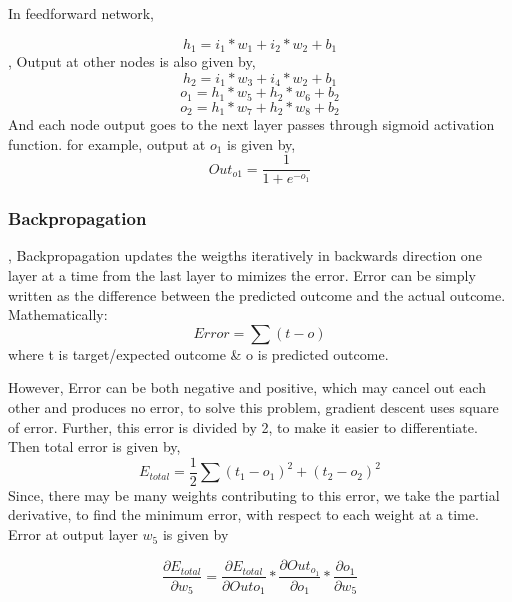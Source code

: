 \documentclass[a4paper,12pt]{report}
\begin{document}
In feedforward network,

\begin{equation}
h_1 = i_1 * w_1 + i_2 * w_2+ b_1
\end{equation},
Output at other nodes is also given by,
\begin{equation}
h_2 = i_1 * w_3 + i_4 * w_2+ b_1
\end{equation}
\begin{equation}
o_1 = h_1 * w_5 + h_2 * w_6+ b_2
\end{equation}
\begin{equation}
o_2 = h_1 * w_7 + h_2 * w_8+ b_2
\end{equation}
And each node output goes to the next layer passes through sigmoid activation function. for example,
output at $o_1$ is given by,
\begin{equation}
Out_{o1} = \frac{1}{1+e^{-o_1}} 
\end{equation}

\subsubsection*{Backpropagation},
Backpropagation updates the weigths iteratively in backwards direction one layer at a time from the last layer to mimizes the error. Error can be simply written as the difference between the predicted outcome and the actual outcome. Mathematically:
\begin{equation}
Error = \sum (t-o)
\end{equation}
where t is target/expected outcome \& o is predicted outcome.


However, Error can be both negative and positive, which may cancel out each other and produces no error, to solve this problem, gradient descent uses square of error.  Further, this error is divided by 2, to make it easier to differentiate.
Then total error is given by,
\begin{equation}
E_{total} = \frac{1}{2} \sum (t_1-o_1)^2 + (t_2-o_2)^2
\end{equation}
Since, there may be many weights contributing to this error, we take the partial derivative, to find the minimum error, with respect to each weight at a time. Error at output layer $w_5$ is given by

\begin{equation}
\frac{\partial E_{total}}{\partial w_5} = \frac{\partial E_{total}}{\partial Out{o_1}} * \frac{\partial Out_{o_1}}{\partial o_1}  * \frac{\partial o_1}{\partial w_5} 
\end{equation}
\end{document}
